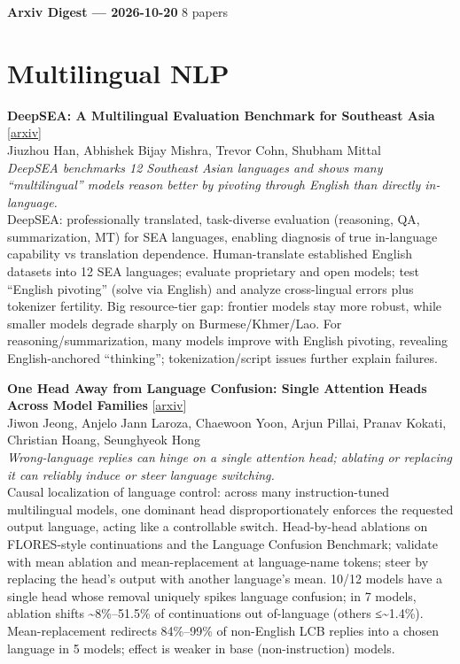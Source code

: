\documentclass[12pt,letterpaper]{article}
\begin{document}
{\footnotesize\textbf{Arxiv Digest --- 2026-10-20} \hfill 8 papers}

\smallskip

\section*{Multilingual NLP}

{\small\textbf{DeepSEA: A Multilingual Evaluation Benchmark for Southeast Asia}} {\scriptsize[\href{https://arxiv.org/abs/2610.26155}{arxiv}]}\\
{\scriptsize Jiuzhou Han, Abhishek Bijay Mishra, Trevor Cohn, Shubham Mittal}\\

{\small\textit{DeepSEA benchmarks 12 Southeast Asian languages and shows many ``multilingual'' models reason better by pivoting through English than directly in-language.}}\\[1pt]
{\footnotesize DeepSEA: professionally translated, task-diverse evaluation (reasoning, QA, summarization, MT) for SEA languages, enabling diagnosis of true in-language capability vs translation dependence. Human-translate established English datasets into 12 SEA languages; evaluate proprietary and open models; test ``English pivoting'' (solve via English) and analyze cross-lingual errors plus tokenizer fertility. Big resource-tier gap: frontier models stay more robust, while smaller models degrade sharply on Burmese/Khmer/Lao. For reasoning/summarization, many models improve with English pivoting, revealing English-anchored ``thinking''; tokenization/script issues further explain failures.}

\medskip

{\small\textbf{One Head Away from Language Confusion: Single Attention Heads Across Model Families}} {\scriptsize[\href{https://arxiv.org/abs/2610.25026}{arxiv}]}\\
{\scriptsize Jiwon Jeong, Anjelo Jann Laroza, Chaewoon Yoon, Arjun Pillai, Pranav Kokati, Christian Hoang, Seunghyeok Hong}\\

{\small\textit{Wrong-language replies can hinge on a single attention head; ablating or replacing it can reliably induce or steer language switching.}}\\[1pt]
{\footnotesize Causal localization of language control: across many instruction-tuned multilingual models, one dominant head disproportionately enforces the requested output language, acting like a controllable switch. Head-by-head ablations on FLORES-style continuations and the Language Confusion Benchmark; validate with mean ablation and mean-replacement at language-name tokens; steer by replacing the head's output with another language's mean. 10/12 models have a single head whose removal uniquely spikes language confusion; in 7 models, ablation shifts \textasciitilde{}8\%--51.5\% of continuations out of-language (others ≤\textasciitilde{}1.4\%). Mean-replacement redirects 84\%--99\% of non-English LCB replies into a chosen language in 5 models; effect is weaker in base (non-instruction) models.}
\end{document}
